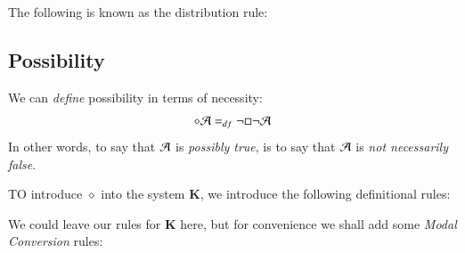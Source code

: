 \documentclass[12pt, a4paper, oneside, openright, titlepage]{book}
\begin{document}
\begin{eg}
    The following is known as the distribution rule: 
    \begin{fitchproof}
        \open
            \open
                 
                 
                 
            \close
        \close
         
    \end{fitchproof}
\end{eg}


\subsection{\textsection Possibility}

\begin{defn}
    We can \emph{define} possibility in terms of necessity: \begin{equation*}
        \diamond \mathcal{A} =_{df} \neg\square\neg\mathcal{A}
    \end{equation*}
    In other words, to say that $\mathcal{A}$ is \emph{possibly true}, is to say that $\mathcal{A}$ is \emph{not necessarily false}.
\end{defn}


\begin{defn}
    TO introduce $\diamond$ into the system \textbf{K}, we introduce the following definitional rules: 
    \begin{fitchproof}
         
    \end{fitchproof}
    \begin{fitchproof}
         
    \end{fitchproof}
\end{defn}

We could leave our rules for \textbf{K} here, but for convenience we shall add some \emph{Modal Conversion} rules: 
\end{document}
